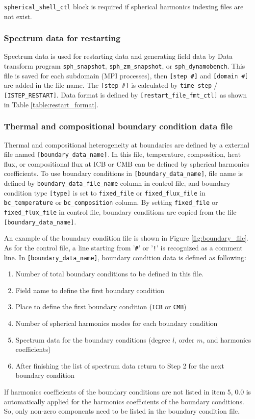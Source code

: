 %
\verb|spherical_shell_ctl| block is required if spherical harmonics indexing files are not exist.
%
\subsubsection{Spectrum data for restarting}
Spectrum data is used for restarting data and generating field data by Data transform program \verb|sph_snapshot|, \verb|sph_zm_snapshot|, or \verb|sph_dynamobench|. This file is saved for each subdomain (MPI processes), then \verb|[step #]| and \verb|[domain #]| are added in the file name. The \verb|[step #]| is calculated by \verb|time step| / \verb|[ISTEP_RESTART]|. Data format is defined by \verb|[restart_file_fmt_ctl]| as shown in Table \ref{table:restart_format}.

\subsubsection{Thermal and compositional boundary condition data file}\label{sec:boundary_file}
Thermal and compositional heterogeneity at boundaries are defined by a external file named  \verb|[boundary_data_name]|. In this file, temperature, composition, heat flux, or compositional flux at ICB or CMB can be defined by spherical harmonics coefficients. To use boundary conditions in \verb|[boundary_data_name]|, file name is defined by \verb|boundary_data_file_name| column in control file, and boundary condition type \verb|[type]| is set to \verb|fixed_file| or \verb|fixed_flux_file| in \verb|bc_temperature| or \verb|bc_composition| column. By setting \verb|fixed_file| or \verb|fixed_flux_file| in control file, boundary conditions are copied from the file \verb|[boundary_data_name]|.

An example of the boundary condition file is shown in Figure \ref{fig:boundary_file}. As for the control file, a line starting from '\verb|#|' or '\verb|!|' is recognized as a comment line. In \verb|[boundary_data_name]|, boundary condition data is defined as following:
%
\begin{enumerate}
\item  Number of total boundary conditions to be defined in this file.
\item  Field name to define the first boundary condition
\item  Place to define the first boundary condition (\verb|ICB| or \verb|CMB|)
\item  Number of spherical harmonics modes for each boundary condition
\item  Spectrum data for the boundary conditions (degree $l$, order $m$, and harmonics coefficients)
\item  After finishing the list of spectrum data return to Step 2 for the next boundary condition
\end{enumerate}
%
If harmonics coefficients of the boundary conditions are not listed in item 5, 0.0 is automatically applied for the harmonics coefficients of the boundary conditions. So, only non-zero components need to be listed in the boundary condition file.

